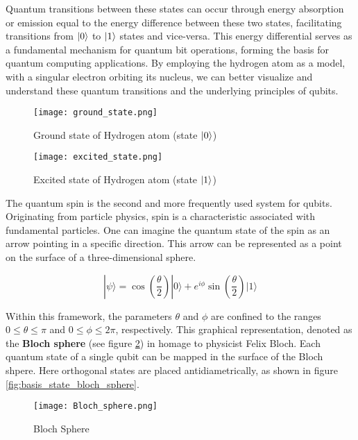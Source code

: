 \documentclass[12pt,a4paper]{report}
\begin{document}
\noindent
Quantum transitions between these states can occur through energy absorption or emission equal to the energy difference between these two states, facilitating transitions from $\ket{0}$ to $\ket{1}$ states and vice-versa. This energy differential serves as a fundamental mechanism for quantum bit operations, forming the basis for quantum computing applications. By employing the hydrogen atom as a model, with a singular electron orbiting its nucleus, we can better visualize and understand these quantum transitions and the underlying principles of qubits.


\begin{figure}[h]
    \centering
    \begin{minipage}{0.45\textwidth}
        \centering
        \texttt{[image: ground\_state.png]}
        \caption{Ground state of Hydrogen atom (state $\ket{0}$)}
        \label{fig:h_ground}
    \end{minipage}\hfill
    \begin{minipage}{0.45\textwidth}
        \centering
        \texttt{[image: excited\_state.png]}
        \caption{Excited state of Hydrogen atom (state $\ket{1}$)}
        \label{fig:h_excited}
    \end{minipage}
\end{figure}


\noindent
The quantum spin is the second and more frequently used system for qubits. Originating from particle physics, spin is a characteristic associated with fundamental particles. One can imagine the quantum state of the spin as an arrow pointing in a specific direction. This arrow can be represented as a point on the surface of a three-dimensional sphere.

\[
    |\psi\rangle = \cos\left(\frac{\theta}{2}\right) |0\rangle + 
    e^{i\phi} \sin\left(\frac{\theta}{2}\right) |1\rangle
\]

\noindent
Within this framework, the parameters \( \theta \) and \( \phi \) are confined to the ranges \( 0 \leq \theta \leq \pi \) and \( 0 \leq \phi \leq 2\pi \), respectively. This graphical representation, denoted as the \textbf{Bloch sphere} (see figure \ref{fig:Bloch_Sphere}) in homage to physicist Felix Bloch. Each quantum state of a single qubit can be mapped in the surface of the Bloch shpere. Here orthogonal states are placed antidiametrically, as shown in figure \ref{fig:basis_state_bloch_sphere}.

\newpage
\begin{figure}[h]
  \centering
  \texttt{[image: Bloch\_sphere.png]}
  \caption{Bloch Sphere}
  \label{fig:Bloch_Sphere}
\end{figure}
\end{document}
